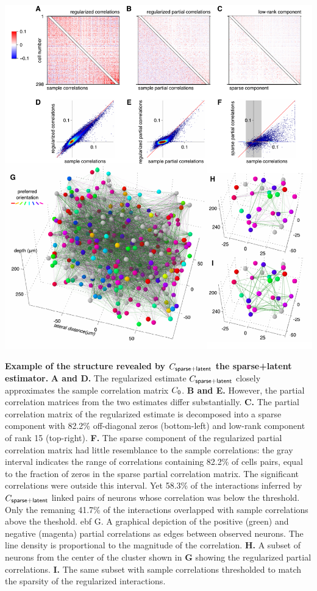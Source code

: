 \documentclass[10pt]{article}
\begin{document}
\begin{FPfigure}
    \begin{center}
        \includegraphics[width=17.35cm]{./figures/Figure05.pdf}
    \end{center}
    \caption{{\bf Example of the structure revealed by $C_{\sf sparse+latent}$ the sparse+latent estimator.}
    {\bf A and D.} The regularized estimate $C_{\sf sparse+latent}$ closely approximates the sample correlation matrix $C_{\sf 0}$. 
    {\bf B and E.} However, the partial correlation matrices from the two estimates differ substantially.
    {\bf C.} The partial correlation matrix of the regularized estimate is decomposed into a sparse component with 82.2\% off-diagonal zeros (bottom-left) and low-rank component of rank 15 (top-right).
    {\bf F.} The sparse component of the regularized partial correlation matrix had little resemblance to the sample correlations: the gray interval indicates the range of correlations containing 82.2\% of cells pairs, equal to the fraction of zeros in the sparse partial correlation matrix. The significant correlations were outside this interval. Yet 58.3\% of the interactions inferred by $C_{\sf sparse+latent}$  linked pairs of neurons whose correlation was below the threshold. Only the remaning 41.7\% of the interactions overlapped with sample correlations above the theshold.
    {ebf G.} A graphical depiction of the positive (green) and negative (magenta) partial correlations as edges between observed neurons. The line density is proportional to the magnitude of the correlation.
    {\bf H.} A subset of neurons from the center of the cluster shown in {\bf G} showing the regularized partial correlations.
    {\bf I.} The same subset with sample correlations thresholded to match the sparsity of the regularized interactions.
}
\label{fig:05}
\end{FPfigure}
\end{document}
